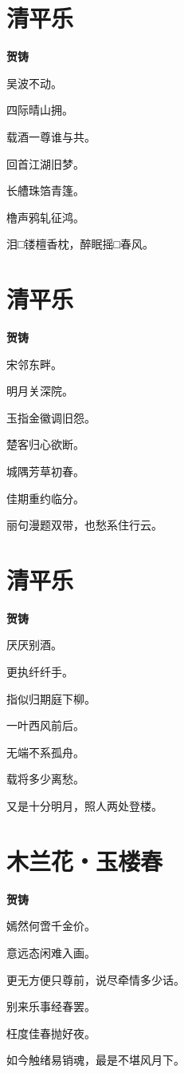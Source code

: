 \documentclass[12pt,a4paper]{ctexbook}
\begin{document}
\section{清平乐}
\textbf{贺铸}\par\vspace{0.5em}
吴波不动。\par
四际晴山拥。\par
载酒一尊谁与共。\par
回首江湖旧梦。\par
长艚珠箔青篷。\par
橹声鸦轧征鸿。\par
泪□镂檀香枕，醉眠摇□春风。\par

\section{清平乐}
\textbf{贺铸}\par\vspace{0.5em}
宋邻东畔。\par
明月关深院。\par
玉指金徽调旧怨。\par
楚客归心欲断。\par
城隅芳草初春。\par
佳期重约临分。\par
丽句漫题双带，也愁系住行云。\par

\section{清平乐}
\textbf{贺铸}\par\vspace{0.5em}
厌厌别酒。\par
更执纤纤手。\par
指似归期庭下柳。\par
一叶西风前后。\par
无端不系孤舟。\par
载将多少离愁。\par
又是十分明月，照人两处登楼。\par

\section{木兰花・玉楼春}
\textbf{贺铸}\par\vspace{0.5em}
嫣然何啻千金价。\par
意远态闲难入画。\par
更无方便只尊前，说尽牵情多少话。\par
别来乐事经春罢。\par
枉度佳春抛好夜。\par
如今触绪易销魂，最是不堪风月下。\par
\end{document}

